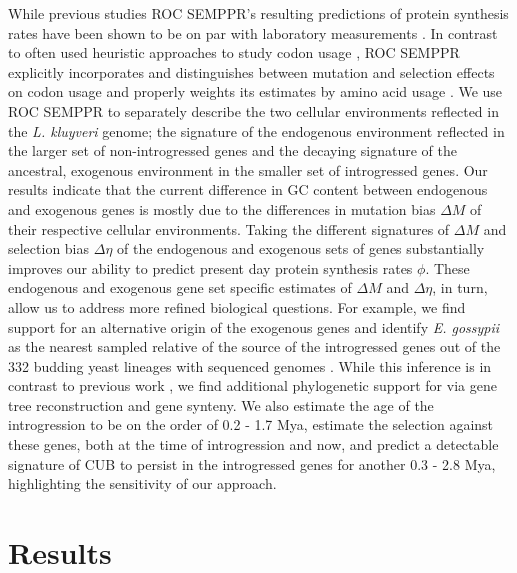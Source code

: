 \documentclass[doublespacing,linenumbers]{bmcart-modified}
\newcommand{\kluyveri}{\textit{L. kluyveri}\xspace}
\newcommand{\gossypii}{\textit{E. gossypii}\xspace}
\newcommand{\ROC}{ROC SEMPPR\xspace}
\newcommand{\GC}{GC content\xspace}
\newcommand{\DM}{\ensuremath{{\Delta M}}\xspace}
\newcommand{\DE}{\ensuremath{{\Delta \eta}}\xspace}
\begin{document}
While previous studies %
\ROC's resulting predictions of protein synthesis rates have been shown to be on par with laboratory measurements \citep{ShahAndGilchrist2011, gilchrist2015}.
In contrast to often used heuristic approaches to study codon usage \citep{sharp1987, Wright1990, dosreis2004}, \ROC explicitly incorporates and distinguishes between mutation and selection effects on codon usage and properly weights its estimates by amino acid usage \citep{cope2018}. %
We use \ROC to separately describe the two cellular environments reflected in the \kluyveri genome; the signature of the endogenous environment reflected in the larger set of non-introgressed genes and the decaying signature of the ancestral, exogenous environment in the smaller set of introgressed genes.
Our results indicate that the current difference in \GC between endogenous and exogenous genes is mostly due to the differences in mutation bias \DM of their respective cellular environments.
Taking the different signatures of \DM and selection bias \DE of the endogenous and exogenous sets of genes substantially improves our ability to predict present day protein synthesis rates $\phi$.
These endogenous and exogenous gene set specific estimates of \DM and \DE, in turn, allow us to address more refined biological questions.
For example, we find support for an alternative origin of the exogenous genes and identify \gossypii as the nearest sampled relative of the source of the introgressed genes out of the 332 budding yeast lineages with sequenced genomes \citep{shen2018}.
While this inference is in contrast to previous work \citep{payen2009, friedrich2015, vakirlis2016, brion2017}, we find additional phylogenetic support for via gene tree reconstruction and gene synteny.
We also estimate the age of the introgression to be on the order of 0.2 - 1.7 Mya, estimate the selection against these genes, both at the time of introgression and now, and predict a detectable signature of CUB to persist in the introgressed genes for another 0.3 - 2.8 Mya, highlighting the sensitivity of our approach.

\section*{Results}
\end{document}
